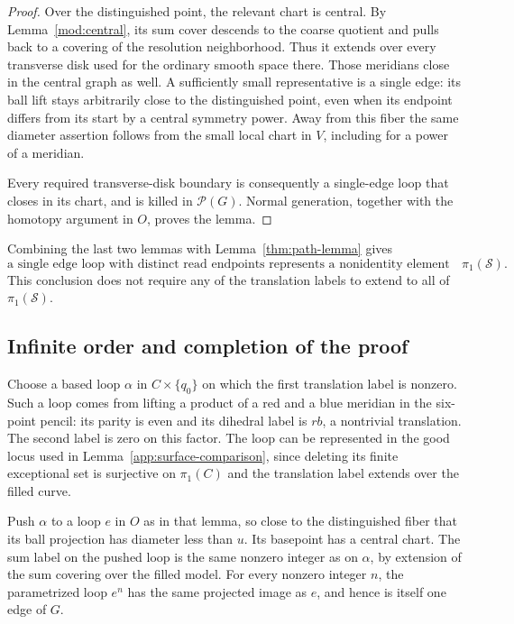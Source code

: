 \documentclass[11pt,reqno]{amsart}
\numberwithin{equation}{section}
\theoremstyle{definition}
\theoremstyle{remark}
\begin{document}
\begin{proof}
Over the distinguished point, the relevant chart is central.  By
Lemma~\ref{mod:central}, its sum cover descends to the coarse quotient
and pulls back to a covering of the resolution neighborhood.  Thus
it extends over every transverse disk used for the ordinary smooth
space there.  Those meridians close in the central graph as well.
A sufficiently small representative is a single edge: its ball lift
stays arbitrarily close to the distinguished point, even when its
endpoint differs from its start by a central symmetry power.
Away from this fiber the same diameter assertion follows from the
small local chart in $V$, including for a power of a meridian.

Every required transverse-disk boundary is consequently a
single-edge loop that closes in its chart, and is killed in
$\mathcal P(G)$.  Normal generation, together with the homotopy
argument in $O$, proves the lemma.
\end{proof}

Combining the last two lemmas with Lemma~\ref{thm:path-lemma} gives
\begin{equation}\label{app:detection}
 \text{a single edge loop with distinct read endpoints represents a
 nonidentity element of }\pi_1(\mathcal S).
\end{equation}
This conclusion does not require any of the translation labels to
extend to all of $\pi_1(\mathcal S)$.

\subsection{Infinite order and completion of the proof}

Choose a based loop $\alpha$ in $C\times\{q_0\}$ on which the first
translation label is nonzero.  Such a loop comes from lifting a
product of a red and a blue meridian in the six-point pencil: its
parity is even and its dihedral label is $rb$, a nontrivial
translation.  The second label is zero on this factor.  The loop
can be represented in the good locus used in
Lemma~\ref{app:surface-comparison}, since deleting its finite
exceptional set is surjective on $\pi_1(C)$ and the translation label
extends over the filled curve.

Push $\alpha$ to a loop $e$ in $O$ as in that lemma, so close to the
distinguished fiber that its ball projection has diameter less than
$u$.  Its basepoint has a central chart.  The sum label on the pushed
loop is the same nonzero integer as on $\alpha$, by extension of the
sum covering over the filled model.  For every nonzero integer $n$,
the parametrized loop $e^n$ has the same projected image as $e$, and
hence is itself one edge of $G$.
\end{document}

